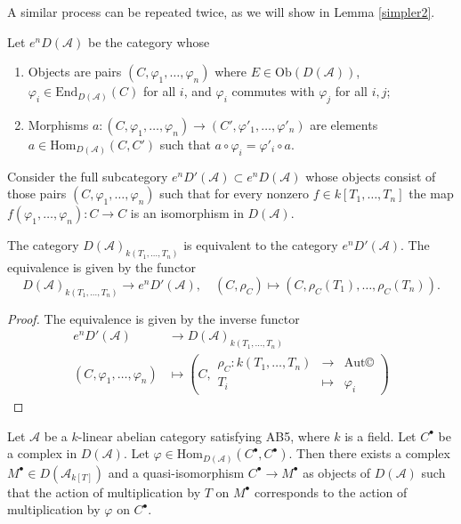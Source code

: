 \documentclass{amsart}
\begin{document}
A similar process can be repeated twice, as we will show in Lemma \ref{simpler2}. 

\begin{lemma}\label{equivalence}
Let $e^{n}D(\mathcal{A})$ be the category whose
\begin{enumerate}
\item Objects are pairs $(C, \varphi_{1},\dots,\varphi_{n})$ where $E \in \mathrm{Ob}(D(\mathcal{A}))$, $\varphi_{i} \in \mathrm{End}_{D(\mathcal{A})}(C)$ for all $i$, and $\varphi_{i}$ commutes with $\varphi_{j}$ for all $i,j$;
\item Morphisms $a : (C, \varphi_{1},\dots,\varphi_{n}) \to (C', \varphi'_{1},\dots,\varphi'_{n})$ are elements
$a \in \mathrm{Hom}_{D(\mathcal{A})}(C, C')$ such that $a \circ \varphi_{i} = \varphi'_{i} \circ a$.
\end{enumerate}
Consider the full subcategory $e^{n}D'(\mathcal{A}) \subset e^{n}D(\mathcal{A})$
whose objects consist
of those pairs $(C, \varphi_{1},\dots,\varphi_{n})$ such that for every nonzero $f \in k[T_{1},\ldots,T_{n}]$
the map $f(\varphi_{1},\dots,\varphi_{n}) : C \to C$ is an isomorphism in $D(\mathcal{A})$. 

The category $D(\mathcal{A})_{k(T_{1},\ldots,T_{n})}$ is equivalent to the category $e^{n}D'(\mathcal{A})$. The equivalence is given by the functor
$$
D(\mathcal{A})_{k(T_{1},\ldots,T_{n})} \longrightarrow e^{n}D'(\mathcal{A}),
\quad
(C, \rho_C) \longmapsto (C, \rho_C(T_{1}),\ldots, \rho_C(T_{n})).
$$
\end{lemma}

\begin{proof}
The equivalence is given by the inverse functor
\begin{align*}
e^{n}D'(\mathcal{A}) &\longrightarrow D(\mathcal{A})_{k(T_{1},\ldots,T_{n})} \\
(C,\varphi_{1},\ldots,\varphi_{n}) & \mapsto 
\left(C, \begin{array}{rcl} \rho_{C}:k(T_{1},\ldots,T_{n}) & {\rightarrow} & \mathrm{Aut}©\\ T_{i}& \mapsto & \varphi_{i} \end{array}\right)
\end{align*}

\end{proof}

\begin{lemma}\label{simpler}
Let $\mathcal{A}$ be a $k$-linear abelian category satisfying AB5, where $k$ is a field. Let $C^\bullet$ be a complex in $D(\mathcal{A})$. Let $\varphi \in \mathrm{Hom}_{D(\mathcal{A})}(C^\bullet, C^\bullet)$. Then there exists a complex
$M^{\bullet}\in D(\mathcal{A}_{k[T]})$ and a quasi-isomorphism $C^\bullet \to M^\bullet$ as objects of $D(\mathcal{A})$ such that the action of multiplication by $T$ on $M^\bullet$ corresponds to the action of multiplication by $\varphi$
on $C^\bullet$.
\end{lemma}
\end{document}
